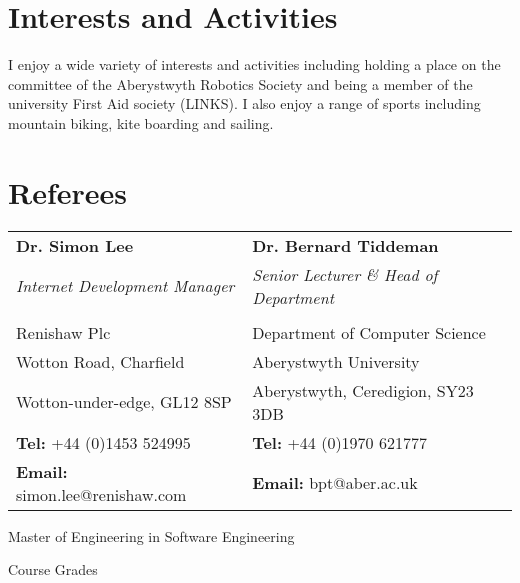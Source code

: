 \documentclass[a4paper, 10pt]{extarticle} %
\begin{document}

\section{Interests and Activities}

{\small I enjoy a wide variety of interests and activities including holding a place on the committee of the Aberystwyth Robotics Society and being a member of the university First Aid society (LINKS). I also enjoy a range of sports including mountain biking, kite boarding and sailing.}

\section{Referees}

\begin{small}
\begin{tabularx}{\textwidth}{X X}

\textbf{Dr. Simon Lee} & \textbf{Dr. Bernard Tiddeman} \\
\textit{Internet Development Manager} & \textit{Senior Lecturer \& Head of Department} \\\\ 

Renishaw Plc & Department of Computer Science \\ 
Wotton Road, Charfield & Aberystwyth University \\ 
Wotton-under-edge, GL12 8SP & Aberystwyth, Ceredigion, SY23 3DB  \\
\textbf{Tel:} +44 (0)1453 524995 & \textbf{Tel:}  +44 (0)1970 621777 \\
\textbf{Email:} simon.lee@renishaw.com & \textbf{Email:} bpt@aber.ac.uk

\end{tabularx}

\end{small}

\newpage


\par{\centering\Large \hypertarget{grds}{Master of Engineering in {Software Engineering}}\par}\large{\centering Course Grades\par}\normalsize
\end{document}
